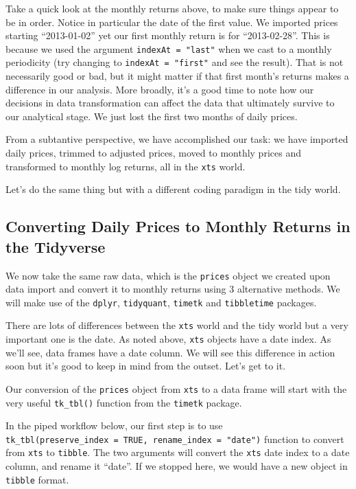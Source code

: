 \documentclass[]{krantz}
\begin{document}
Take a quick look at the monthly returns above, to make sure things
appear to be in order. Notice in particular the date of the first value.
We imported prices starting ``2013-01-02'' yet our first monthly return
is for ``2013-02-28''. This is because we used the argument
\texttt{indexAt\ =\ "last"} when we cast to a monthly periodicity (try
changing to \texttt{indexAt\ =\ "first"} and see the result). That is
not necessarily good or bad, but it might matter if that first month's
returns makes a difference in our analysis. More broadly, it's a good
time to note how our decisions in data transformation can affect the
data that ultimately survive to our analytical stage. We just lost the
first two months of daily prices.

From a subtantive perspective, we have accomplished our task: we have
imported daily prices, trimmed to adjusted prices, moved to monthly
prices and transformed to monthly log returns, all in the \texttt{xts}
world.

Let's do the same thing but with a different coding paradigm in the tidy
world.

\subsection*{Converting Daily Prices to Monthly Returns in the
Tidyverse}\label{converting-daily-prices-to-monthly-returns-in-the-tidyverse}

We now take the same raw data, which is the \texttt{prices} object we
created upon data import and convert it to monthly returns using 3
alternative methods. We will make use of the \texttt{dplyr},
\texttt{tidyquant}, \texttt{timetk} and \texttt{tibbletime} packages.

There are lots of differences between the \texttt{xts} world and the
tidy world but a very important one is the date. As noted above,
\texttt{xts} objects have a date index. As we'll see, data frames have a
date column. We will see this difference in action soon but it's good to
keep in mind from the outset. Let's get to it.

Our conversion of the \texttt{prices} object from \texttt{xts} to a data
frame will start with the very useful \texttt{tk\_tbl()} function from
the \texttt{timetk} package.

In the piped workflow below, our first step is to use
\texttt{tk\_tbl(preserve\_index\ =\ TRUE,\ rename\_index\ =\ "date")}
function to convert from \texttt{xts} to \texttt{tibble}. The two
arguments will convert the \texttt{xts} date index to a date column, and
rename it ``date''. If we stopped here, we would have a new object in
\texttt{tibble} format.
\end{document}
